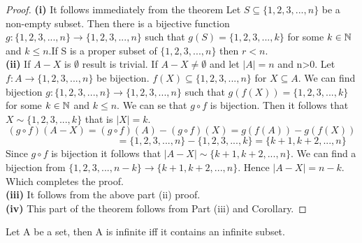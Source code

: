 \documentclass[a4paper,english,12pt]{article}   	%
\begin{document}
\begin{proof}
\textbf{(i)} It follows immediately from the theorem Let $S \subseteq \{1,2,3,...,n\}$  be a non-empty subset. Then there is a bijective function $g \colon \{1,2,3,...,n\} \to \{1,2,3,...,n\}$ such that $g(S) =  \{1,2,3,...,k\}$ for some $k \in \mathbb{N}$ and $k \leq n$.If S is a proper subset of $\{1,2,3,...,n\}$ then $r < n$.\\
\textbf{(ii)} If $A - X$ is $\emptyset$ result is trivial. If $A - X \neq \emptyset$ and let $|A|=n$ and n>0. Let $f \colon A \to \{1,2,3,...,n\}$ be bijection. $f(X) \subseteq \{1,2,3,...,n\}$ for $X \subseteq A$. We can find bijection $g \colon \{1,2,3,...,n\} \to \{1,2,3,...,n\}$ such that $g(f(X)) =  \{1,2,3,...,k\}$ for some $k \in \mathbb{N}$ and $k \leq n$. We can se that $g \circ f$ is bijection. Then it follows that $X \sim  \{1,2,3,...,k\}$ that is $|X|=k$.\\
\[ (g \circ f)(A-X)=(g \circ f)(A)-(g \circ f)(X)= g(f(A))-g(f(X))\]
$\qquad \qquad \qquad \qquad \qquad \,\,\,\,\,\,\,\,   =\{1,2,3,...,n\}-\{1,2,3,...,k\} = \{k+1,k+2,...,n\}$\\
Since $g \circ f$ is bijection it follows that $|A-X| \sim \{k+1,k+2,...,n\}$. We can find a bijection from $\{1,2,3,...,n-k\} \to \{k+1,k+2,...,n\}$. Hence $|A-X|=n-k$.
Which completes the proof.\\
\textbf{(iii)} It follows from the above part (ii) proof.\\
\textbf{(iv)} This part of the theorem follows from Part (iii) and Corollary.

\end{proof}
\begin{cor} Let A be a set, then A is infinite iff it contains an infinite subset.
\end{cor}
\end{document}
